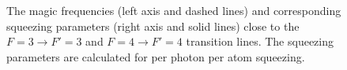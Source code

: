 \begin{figure}
\begin{minipage}{.91\linewidth}
\centering
{}
\end{minipage}
\par\medskip
\begin{minipage}{.91\linewidth}
\centering
{}
\end{minipage}
\caption{The magic frequencies (left axis and dashed lines) and corresponding squeezing parameters 
(right axis and solid lines) close to the $ 
F=3\rightarrow F'=3 $ and $ F=4\rightarrow F'=4 $ transition lines. The squeezing parameters are 
calculated for per photon per atom squeezing. }\label{fig:MagicwavelengSqueezingpara}
\end{figure}

